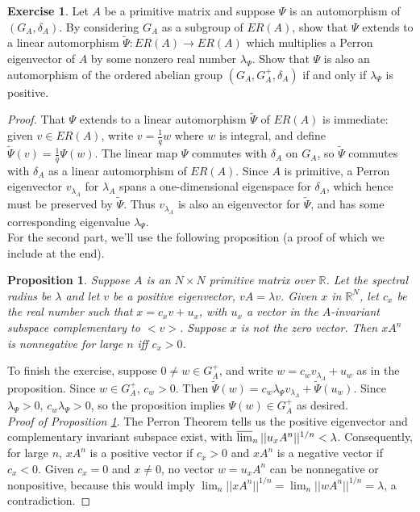 \documentclass{amsart}
\newtheorem{prop}[equation]{Proposition}
\theoremstyle{definition}
\newtheorem{exer}[equation]{Exercise}
\theoremstyle{definition}
\newcommand{\R}{\mathbb R}
\numberwithin{equation}{subsection}
\begin{document}
\begin{exer}\label{appexer:indextwoorderautos}
Let $A$ be a primitive matrix and suppose $\Psi$ is an automorphism of $(G_{A},\delta_{A})$. By considering $G_{A}$ as a subgroup of $ER(A)$, show that $\Psi$ extends to a linear automorphism $\tilde{\Psi} \colon ER(A) \to ER(A)$ which multiplies a Perron eigenvector of $A$ by some nonzero real number $\lambda_{\Psi}$. Show that $\Psi$ is also an automorphism of the ordered abelian group $(G_{A},G_{A}^{+},\delta_{A})$ if and only if $\lambda_{\Psi}$ is positive.
\end{exer}
\begin{proof}
That $\Psi$ extends to a linear automorphism $\tilde{\Psi}$ of $ER(A)$ is immediate: given $v \in ER(A)$, write $v = \frac{1}{q}w$ where $w$ is integral, and define $\tilde{\Psi}(v) = \frac{1}{q}\Psi(w)$. The linear map $\Psi$ commutes with $\delta_{A}$ on $G_{A}$, so $\tilde{\Psi}$ commutes with $\delta_{A}$ as a linear automorphism of $ER(A)$. Since $A$ is primitive, a Perron eigenvector $v_{\lambda_{A}}$ for $\lambda_{A}$ spans a one-dimensional eigenspace for $\delta_{A}$, which hence must be preserved by $\tilde{\Psi}$. Thus $v_{\lambda_{A}}$ is also an eigenvector for $\tilde{\Psi}$, and has some corresponding eigenvalue $\lambda_{\Psi}$.\\
\indent For the second part, we'll use the following proposition (a proof of which we include at the end).

\begin{prop} \label{mixingdimgroupprop}
Suppose $A$ is an $N\times N$  primitive matrix over $\R$.
Let the spectral radius be $\lambda$ and let $v$ be a positive eigenvector,
$vA = \lambda v$. Given $x$ in $\R^N$, let
$c_x$ be the real number such that $x= c_xv + u_x$, with
$u_x$ a vector in the  $A$-invariant subspace complementary to $<v>$. Suppose $x$ is not
the zero vector.
Then $xA^n$ is nonnegative for large $n$ iff $c_x>0$.
\end{prop}

To finish the exercise, suppose $0 \ne w \in G_{A}^{+}$, and write $w = c_{w}v_{\lambda_{A}}+u_{w}$ as in the proposition. Since $w \in G_{A}^{+}$, $c_{w} > 0$. Then $\tilde{\Psi}(w) = c_{w}\lambda_{\Psi}v_{\lambda_{A}} + \tilde{\Psi}(u_{w})$. Since $\lambda_{\Psi} > 0$, $c_{w}\lambda_{\Psi} > 0$, so the proposition implies $\Psi(w) \in G_{A}^{+}$ as desired.\\

{\it Proof of Proposition \ref{mixingdimgroupprop}}. The Perron Theorem tells us the positive eigenvector and complementary
invariant subspace exist, with $\varlimsup_n ||u_xA^n||^{1/n} < \lambda $.
Consequently, for large $n$, $xA^n$ is a positive vector if $c_x>0$ and
$xA^n$ is a negative vector if $c_x < 0$. Given $c_x=0 $ and $x\neq 0$,
no vector $w=u_xA^n $ can be nonnegative or nonpositive, because
this would imply
$\lim_n ||xA^n||^{1/n}= \lim_n ||wA^n||^{1/n} = \lambda $, a contradiction.
\end{proof}
\end{document}
